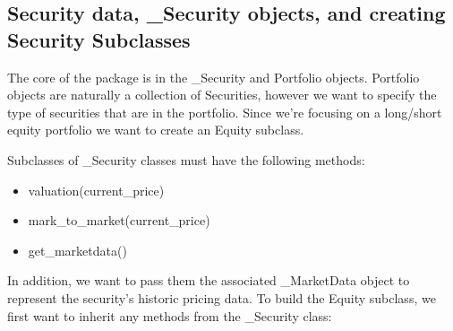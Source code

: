 \documentclass[letterpaper,10pt,english]{sphinxmanual}
\begin{document}
\subsection{Security data, \_Security objects, and creating Security Subclasses}
\label{\detokenize{gettingstarted:security-data-security-objects-and-creating-security-subclasses}}
The core of the package is in the \_Security and Portfolio objects.
Portfolio objects are naturally a collection of Securities, however we
want to specify the type of securities that are in the portfolio. Since
we’re focusing on a long/short equity portfolio we want to create an
Equity subclass.

Subclasses of \_Security classes must have the following methods:
\begin{itemize}
\item {} 
valuation(current\_price)

\item {} 
mark\_to\_market(current\_price)

\item {} 
get\_marketdata()

\end{itemize}

In addition, we want to pass them the associated \_MarketData object to
represent the security’s historic pricing data. To build the Equity
subclass, we first want to inherit any methods from the \_Security
class:

%
\begin{sphinxVerbatim}[commandchars=\\\{\}]
 

     
              
          
          
          
          
            
          
          
\end{sphinxVerbatim}
\end{document}
